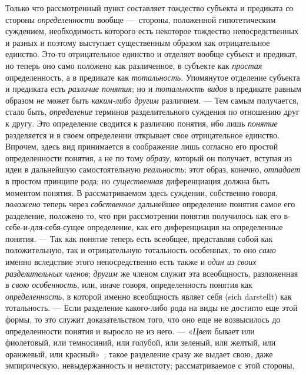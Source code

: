 \documentclass[twoside]{article}
\begin{document}
{{Только что рассмотренный пункт составляет тождество субъекта и
предиката со стороны
{\em определенности}
вообще —~стороны, положенной гипотетическим
суждением, необходимость которого есть некоторое тождество непосредственных
и разных и поэтому выступает существенным образом как отрицательное
единство. Это-то отрицательное единство и отделяет вообще субъект и
предикат, но теперь оно само положено как различенное, в субъекте как
{\em простая}
определенность, а в предикате как
{\em тотальность}.
Упомянутое отделение субъекта и предиката есть
{\em различие понятия};
но и {\em тотальность
видов} в предикате равным образом
{\em не} может быть
{\em каким-либо другим}
различием. — Тем самым получается, стало быть,
{\em определение}
терминов разделительного суждения по отношению друг к другу.
Это определение сводится к различию понятия, ибо лишь
{\em понятие} разделяется
и в своем определении открывает свое отрицательное единство. Впрочем, здесь
вид принимается в соображение лишь согласно его простой определенности
понятия, а не по тому {\em образу},
который он получает, вступая из идеи в дальнейшую
самостоятельную {\em реальность};
этот образ, конечно,
{\em отпадает} в простом
принципе рода; но {\em существенная}
диференциация должна быть моментом понятия. В рассматриваемом
здесь суждении, собственно говоря,
{\em положено} теперь
через {\em собственное}
дальнейшее определение понятия самое его разделение, положено
то, что при рассмотрении понятия получилось как его в-себе-и-для-себя-сущее
определение, как его диференциация на определенные понятия. —
Так как понятие теперь есть всеобщее, представляя собой как
положительную, так и отрицательную тотальность особенных, то оно
{\em само} именно
вследствие этого непосредственно есть также и
{\em один из своих разделительных
членов}; {\em другим} же
членом служит эта всеобщность, разложенная в
{\em свою особенность},
или, иначе говоря, определенность понятия как
{\em определенность}, в
которой именно всеобщность являет себя (sich darstellt) как
тотальность. — Если разделение какого-либо рода на виды не
достигло еще этой формы, то это служит доказательством того, что оно еще не
возвысилось до определенности понятия и выросло не из него. —
«{\em Цвет} бывает или
фиолетовый, или темносиний, или голубой, или зеленый, или желтый, или
оранжевый, или
красный»~\label{bkm:bm40};
такое разделение сразу же выдает свою, даже
эмпирическую, невыдержанность и нечистоту; рассматриваемое с этой стороны,
}}
\end{document}
